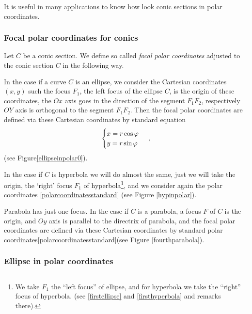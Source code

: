 \documentclass[12pt]{article}
\numberwithin{equation}{section}
\begin{document}
 It is useful in many applications to know how look conic sections
in polar coordinates.


\subsubsection {Focal polar coordinates for conics}
  Let $C$ be a conic section. 
We define 
 so called {\it focal polar coordinates}
adjusted to the conic section  $C$
in the following way.

  
In the case if a curve $C$ is an ellipse, we
consider 
 the Cartesian coordinates $(x,y)$ such
the focus $F_1$, the left focus  of the ellipse $C$,
is  the origin of these coordinates, the  
$Ox$ axis goes in the direction of the segment  $F_1F_2$,
respectively $OY$ axis is orthogonal to the segment $F_1F_2$.
Then the focal polar coordinates are defined via
these Cartesian coordinates by standard equation
               \begin{equation} \label{polarcoordinatesstandard}
      \begin{cases}x=r\cos\varphi\cr 
y=r\sin\varphi\end{cases}\,,
              \end{equation}
(see Figure\eqref{ellipseinpolar0}).


In the case if $C$ is hyperbola we will 
do almost the same, just we will take the origin, the `right'
focus  $F_1$ of hyperbola\footnote 
{We take $F_1$ the ``left focus'' of ellipse,
and for hyperbola we take the ``right'' focus of hyperbola.
(see \eqref{firstellipse} and \eqref{firsthyperbola}
and remarks there).}, 
and we consider again the polar coordinates \eqref{polarcoordinatesstandard}
(see Figure \eqref{hypinpolar}).


   Parabola has just one focus.
In the case if  $C$ is a parabola, a focus $F$ 
of $C$ is the  
origin, and $Oy$ axis is parallel  to the directrix of 
parabola, and
the focal polar coordinates are defined via
these Cartesian coordinates by standard 
polar coordinates\eqref{polarcoordinatesstandard}(see Figure
\eqref{fourthparabola}).


\subsubsection{ Ellipse in polar coordinates}
\end{document}
